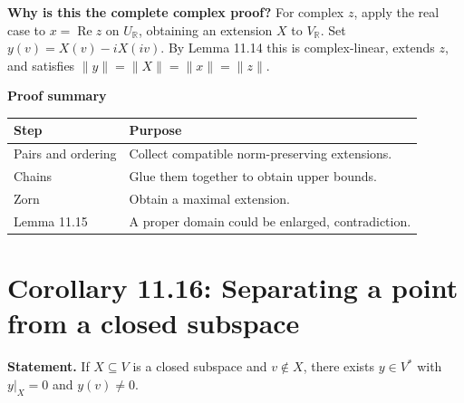 \documentclass[11pt,a4paper]{article}
\newcommand{\prooftable}[1]{\medskip\textbf{Proof summary}\par\smallskip #1\medskip}
\begin{document}
\begin{personalnote}
\textbf{Why is this the complete complex proof?} For complex \(z\), apply the real case to \(x=\operatorname{Re}z\) on \(U_{\mathbb R}\), obtaining an extension \(X\) to \(V_{\mathbb R}\). Set \(y(v)=X(v)-iX(iv)\). By Lemma 11.14 this is complex-linear, extends \(z\), and satisfies \(\|y\|=\|X\|=\|x\|=\|z\|\).
\end{personalnote}
\prooftable{\begin{tabularx}{\linewidth}{@{}p{.24\linewidth}X@{}}\hline
Step & Purpose\\\hline
Pairs and ordering & Collect compatible norm-preserving extensions.\\
Chains & Glue them together to obtain upper bounds.\\
Zorn & Obtain a maximal extension.\\
Lemma 11.15 & A proper domain could be enlarged, contradiction.\\\hline
\end{tabularx}}

\section{Corollary 11.16: Separating a point from a closed subspace}
\textbf{Statement.} If \(X\subseteq V\) is a closed subspace and \(v\notin X\), there exists \(y\in V^*\) with \(y|_X=0\) and \(y(v)\neq0\).
\end{document}
